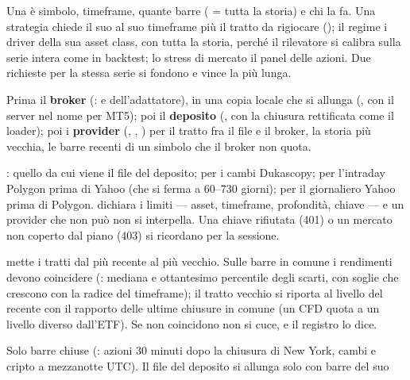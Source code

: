 \begin{description}[leftmargin = 1.4em, style = nextline, itemsep = 4pt]
  \item[Chi chiede che cosa] Una  è simbolo, timeframe,
    quante barre ( = tutta la storia) e chi la fa. Una strategia
    chiede il suo  al suo timeframe più il tratto
    da rigiocare (); il regime i driver della sua asset
    class, con tutta la storia, perché il rilevatore si calibra sulla serie
    intera come in backtest; lo stress di mercato il panel delle azioni.
    Due richieste per la stessa serie si fondono e vince la più lunga.
  \item[In che ordine] Prima il \textbf{broker}
    (:  e
     dell'adattatore), in una copia locale che si allunga
    (, con il server
    nel nome per MT5); poi il \textbf{deposito} (,
    con la chiusura rettificata come il loader); poi i \textbf{provider}
    (, ,
    ) per il tratto fra il file e il broker, la storia
    più vecchia, le barre recenti di un simbolo che il broker non quota.
  \item[Quale provider] : quello da cui viene il
    file del deposito; per i cambi Dukascopy; per l'intraday Polygon prima di
    Yahoo (che si ferma a \num{60}--\num{730} giorni); per il giornaliero
    Yahoo prima di Polygon.  dichiara i limiti --- asset,
    timeframe, profondità, chiave --- e un provider che non può non si
    interpella. Una chiave rifiutata (\num{401}) o un mercato non coperto
    dal piano (\num{403}) si ricordano per la sessione.
  \item[Le giunzioni]  mette i tratti dal più recente al più
    vecchio. Sulle barre in comune i rendimenti devono coincidere
    (: mediana e ottantesimo percentile degli scarti, con
    soglie che crescono con la radice del timeframe); il tratto vecchio si
    riporta al livello del recente con il rapporto delle ultime chiusure in
    comune (un CFD quota a un livello diverso dall'ETF). Se non coincidono
    non si cuce, e il registro lo dice.
  \item[Le regole] Solo barre chiuse (: azioni
    \num{30} minuti dopo la chiusura di New York, cambi e cripto a
    mezzanotte UTC). Il file del deposito si allunga solo con barre del suo

\end{description}
